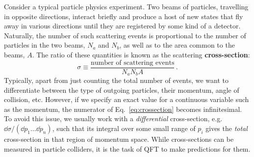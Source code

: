 \documentclass[main.tex]{subfiles}
\begin{document}
Consider a typical particle physics experiment. Two beams of particles, travelling in opposite directions, interact briefly and produce a host of new states that fly away in various directions until they are registered by some kind of a detector. Naturally, the number of such scattering events is proportional to the number of particles in the two beams, $N_a$ and $N_b$, as well as to the area common to the beams, $A$. The ratio of these quantities is known as the scattering \textbf{cross-section}:
\begin{equation} \label{eq:crossection}
    \sigma \equiv \frac{\text{number of scattering events}}{N_a N_b A}\,.
\end{equation}
Typically, apart from just counting the total number of events, we want to differentiate between the type of outgoing particles, their momentum, angle of collision, etc. However, if we specify an exact value for a continuous variable such as the momentum, the numerator of Eq.~\ref{eq:crossection} becomes infinitesimal. To avoid this issue, we usually work with a \textit{differential} cross-section, e.g. $\dd\sigma/(\dd p_1 \ldots \dd p_n)$, such that its integral over some small range of $p_i$ gives the \textit{total} cross-section in that region of momentum space. While cross-sections can be measured in particle colliders, it is the task of QFT to make predictions for them.
\end{document}
